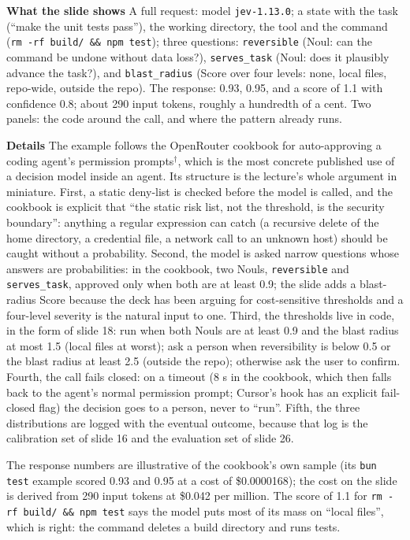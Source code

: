 \documentclass[11pt,letterpaper]{article}
\newcommand{\para}[1]{\medskip\noindent\textbf{#1}\quad}
\begin{document}
\para{What the slide shows} A full request: model \texttt{jev-1.13.0}; a state with the task (``make the unit tests pass''), the working directory, the tool and the command (\texttt{rm -rf build/ \&\& npm test}); three questions: \texttt{reversible} (Noul: can the command be undone without data loss?), \texttt{serves\_task} (Noul: does it plausibly advance the task?), and \texttt{blast\_radius} (Score over four levels: none, local files, repo-wide, outside the repo). The response: 0.93, 0.95, and a score of 1.1 with confidence 0.8; about 290 input tokens, roughly a hundredth of a cent. Two panels: the code around the call, and where the pattern already runs.

\para{Details} The example follows the OpenRouter cookbook for auto-approving a coding agent's permission prompts$^\dagger$, which is the most concrete published use of a decision model inside an agent. Its structure is the lecture's whole argument in miniature. First, a static deny-list is checked before the model is called, and the cookbook is explicit that ``the static risk list, not the threshold, is the security boundary'': anything a regular expression can catch (a recursive delete of the home directory, a credential file, a network call to an unknown host) should be caught without a probability. Second, the model is asked narrow questions whose answers are probabilities: in the cookbook, two Nouls, \texttt{reversible} and \texttt{serves\_task}, approved only when both are at least 0.9; the slide adds a blast-radius Score because the deck has been arguing for cost-sensitive thresholds and a four-level severity is the natural input to one. Third, the thresholds live in code, in the form of slide 18: run when both Nouls are at least 0.9 and the blast radius at most 1.5 (local files at worst); ask a person when reversibility is below 0.5 or the blast radius at least 2.5 (outside the repo); otherwise ask the user to confirm. Fourth, the call fails closed: on a timeout (8 s in the cookbook, which then falls back to the agent's normal permission prompt; Cursor's hook has an explicit fail-closed flag) the decision goes to a person, never to ``run''. Fifth, the three distributions are logged with the eventual outcome, because that log is the calibration set of slide 16 and the evaluation set of slide 26.

The response numbers are illustrative of the cookbook's own sample (its \texttt{bun test} example scored 0.93 and 0.95 at a cost of \$0.0000168); the cost on the slide is derived from 290 input tokens at \$0.042 per million. The score of 1.1 for \texttt{rm -rf build/ \&\& npm test} says the model puts most of its mass on ``local files'', which is right: the command deletes a build directory and runs tests.
\end{document}
